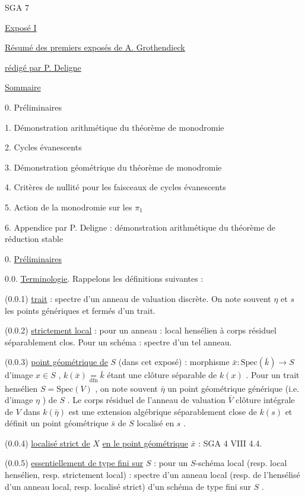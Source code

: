 


SGA 7


\underline{Exposé I}


\underline{\underline{Résumé des premiers exposés de A. Grothendieck}}


\underline{rédigé par P. Deligne}


\underline{Sommaire}

0. Préliminaires

1. Démonstration arithmétique du théorème de monodromie

2. Cycles évanescents

3. Démonstration géométrique du théorème de monodromie

4. Critères de nullité pour les faisceaux de cycles évanescents

5. Action de la monodromie sur les $\pi_1$

6. Appendice par P. Deligne : démonstration arithmétique du
théorème de réduction stable


0. \underline{Préliminaires}

0.0. \underline{Terminologie}. Rappelons les définitions suivantes :

(0.0.1)    \underline{trait} : spectre d'un anneau de valuation discrète. On note souvent  $\eta$  et  $s$  les points génériques et fermés d'un trait.

(0.0.2)    \underline{strictement local} : pour un anneau : local hensélien à corps résiduel séparablement clos. Pour un schéma : spectre d'un tel anneau.

(0.0.3)    \underline{point géométrique de}  $S$  (dans cet exposé) : morphisme  $\bar{x} : \mathrm{Spec}(\bar{k}) \longrightarrow S$  d'image  $x \in S$ , $k(\bar{x}) \underset{\mathrm{dfn}}{=} \bar{k}$  étant une clôture séparable de  $k(x)$ . Pour un trait hensélien  $S = \mathrm{Spec}(V)$ , on note souvent  $\bar{\eta}$  un point géométrique générique (i.e. d'image  $\eta$ ) de  $S$ . Le corps résiduel de l'anneau de valuation  $\bar{V}$  clôture intégrale de  $V$  dans  $k(\bar{\eta})$  est une extension algébrique séparablement close de  $k(s)$  et définit un point géométrique  $\bar{s}$  de  $S$  localisé en  $s$ .



(0.0.4)    \underline{localisé strict de}  $X$  \underline{en le point géométrique}  $\bar{x}$  : SGA 4 VIII 4.4.

(0.0.5)    \underline{essentiellement de type fini sur}  $S$ : pour un $S$-schéma local (resp. local hensélien, resp. strictement local) : spectre d'un anneau local (resp. de l'hensélisé d'un anneau local, resp. localisé strict) d'un schéma de type fini sur  $S$ .

